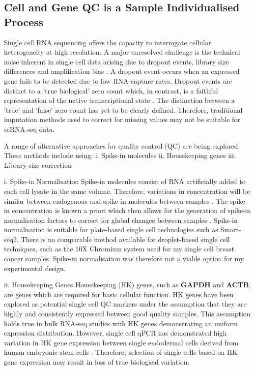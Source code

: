 \subsection{Cell and Gene QC is a Sample Individualised Process}
Single cell RNA sequencing offers the capacity to interrogate cellular heterogeneity at high resolution. A major unresolved challenge is the technical noise inherent in single cell data arising due to dropout events, library size differences and amplification bias \cite{Eraslan2019}. A dropout event occurs when an expressed gene fails to be detected due to low RNA capture rates. Dropout events are distinct to a 'true biological' zero count which, in contrast, is a faithful representation of the native transcriptional state \cite{Eraslan2019}. The distinction between a 'true' and 'false' zero count has yet to be clearly defined. Therefore, traditional imputation methods used to correct for missing values may not be suitable for scRNA-seq data.

A range of alternative approaches for quality control (QC) are being explored. These methods include using:
i. Spike-in molecules
ii. Housekeeping genes 
iii. Library size correction

i. Spike-in Normalisation
Spike-in molecules consist of RNA artificially added to each cell lysate in the same volume. Therefore, variations in concentration will be similar between endogenous and spike-in molecules between samples \cite{Katayama2013}. The spike-in concentration is known a priori which then allows for the generation of spike-in normalisation factors to correct for global changes between samples \cite{Katayama2013}. Spike-in normalisation is suitable for plate-based single cell technologies such as Smart-seq2. There is no comparable method available for droplet-based single cell techniques, such as the 10X Chromium system used for my single cell breast cancer samples. Spike-in normalisation was therefore not a viable option for my experimental design.

ii. Housekeeping Genes
Housekeeping (HK) genes, such as \textbf{GAPDH} and \textbf{ACTB}, are genes which are required for basic cellular function. HK genes have been explored as potential single cell QC markers under the assumption that they are highly and consistently expressed between good quality samples. This assumption holds true in bulk RNA-seq studies with HK genes demonstrating an uniform expression distribution. However, single cell qPCR has demonstrated high variation in HK gene expression between single endodermal cells derived from human embryonic stem cells \cite{Oyolu2012}. Therefore, selection of single cells based on HK gene expression may result in loss of true biological variation.

